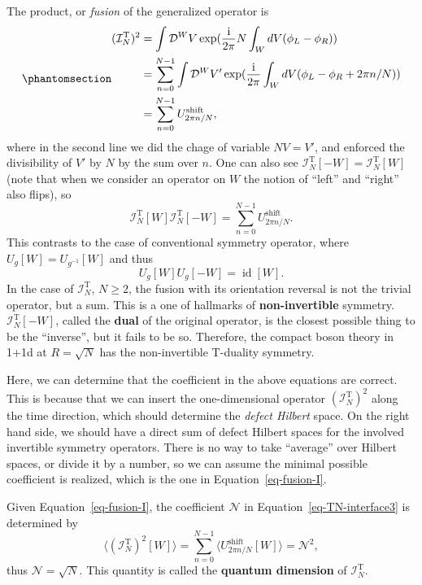 \documentclass[11pt,toc=bibliography]{scrbook}
\DeclareMathOperator{\imunit}{i}
\DeclareMathOperator{\id}{id}
\numberwithin{equation}{section}
\DeclareMathOperator{\imunit}{i}
\DeclareMathOperator{\id}{id}
\begin{document}
The product, or \emph{fusion} of the generalized operator is
\begin{equation}\phantomsection\label{eq-fusion-I}{
\begin{aligned}
(\mathcal{I}_N^\text{T})^2 &= \int \mathcal{D}^W V \exp(\frac{\imunit}{2\pi} N \int_W \mathop{dV}(\phi_L-\phi_R))\\
&= \sum_{n=0}^{N-1} \int \mathcal{D}^W V' \exp(\frac{\imunit}{2\pi}  \int_W \mathop{dV}(\phi_L-\phi_R+ 2\pi n/N))\\
&= \sum_{n=0}^{N-1} U_{2\pi n/N}^{\text{shift}},
\end{aligned}
}\end{equation} where in the second line we did the chage of variable
\(NV = V'\), and enforced the divisibility of \(V'\) by \(N\) by the sum
over \(n\). One can also see
\(\mathcal{I}_N^\text{T}[-W] = \mathcal{I}_N^\text{T}[W]\) (note that
when we consider an operator on \(W\) the notion of ``left'' and
``right'' also flips), so \[
\mathcal{I}_N^\text{T}[W]\mathcal{I}_N^\text{T}[-W] = \sum_{n=0}^{N-1} U_{2\pi n/N}^{\text{shift}}.
\] This contrasts to the case of conventional symmetry operator, where
\(U_g[W] = U_{g^{-1}}[W]\) and thus \[
U_g [W] U_g[-W] = \id[W].
\] In the case of \(\mathcal{I}_N^\text{T}\), \(N\ge 2\), the fusion
with its orientation reversal is not the trivial operator, but a sum.
This is a one of hallmarks of \textbf{non-invertible} symmetry.
\(\mathcal{I}_N^\text{T}[-W]\), called the \textbf{dual} of the original
operator, is the closest possible thing to be the ``inverse'', but it
fails to be so. Therefore, the compact boson theory in 1+1d at
\(R=\sqrt{N}\) has the non-invertible T-duality symmetry.

Here, we can determine that the coefficient in the above equations are
correct. This is because that we can insert the one-dimensional operator
\((\mathcal{I}_N^\text{T})^2\) along the time direction, which should
determine the \emph{defect Hilbert} space. On the right hand side, we
should have a direct sum of defect Hilbert spaces for the involved
invertible symmetry operators. There is no way to take ``average'' over
Hilbert spaces, or divide it by a number, so we can assume the minimal
possible coefficient is realized, which is the one in
Equation~\ref{eq-fusion-I}.

Given Equation~\ref{eq-fusion-I}, the coefficient \(\mathcal{N}\) in
Equation~\ref{eq-TN-interface3} is determined by \[
\langle (\mathcal{I}_N^\text{T})^2[W] \rangle = \sum_{n=0}^{N-1}\langle U_{2\pi n/N}^\text{shift}[W] \rangle = \mathcal{N}^2,
\] thus \(\mathcal{N} = \sqrt{N}\). This quantity is called the
\textbf{quantum dimension} of \(\mathcal{I}_N^\text{T}\).
\end{document}
